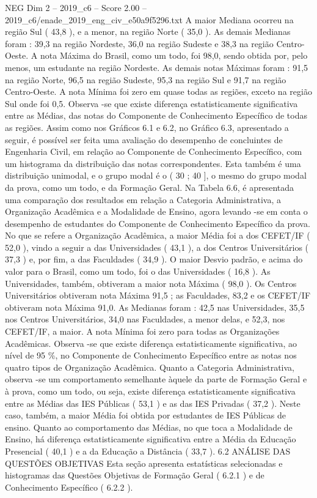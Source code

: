 \begin{textsample}{NEG Dim 2 – 2019\_c6 – Score 2.00 – 2019\_c6/enade\_2019\_eng\_civ\_e50a9f5296.txt}
A maior Mediana ocorreu na região Sul ( 43,8 ), e a menor, na região Norte ( 35,0 ).
As demais Medianas foram : 39,3 na região Nordeste, 36,0 na região Sudeste e 38,3 na região Centro-Oeste.
A nota Máxima do Brasil, como um todo, foi 98,0, sendo obtida por, pelo menos, um estudante na região Nordeste.
As demais notas Máximas foram : 91,5 na região Norte, 96,5 na região Sudeste, 95,3 na região Sul e 91,7 na região Centro-Oeste.
A nota Mínima foi zero em quase todas as regiões, exceto na região Sul onde foi 0,5.
Observa -se que existe diferença estatisticamente significativa entre as Médias, das notas do Componente de Conhecimento Específico de todas as regiões.
Assim como nos Gráficos 6.1 e 6.2, no Gráfico 6.3, apresentado a seguir, é possível ser feita uma avaliação do desempenho de concluintes de Engenharia Civil, em relação ao Componente de Conhecimento Específico, com um histograma da distribuição das notas correspondentes.
Esta também é uma distribuição unimodal, e o grupo modal é o ( 30 ; 40 ], o mesmo do grupo modal da prova, como um todo, e da Formação Geral.
Na Tabela 6.6, é apresentada uma comparação dos resultados em relação a Categoria Administrativa, a Organização Acadêmica e a Modalidade de Ensino, agora levando -se em conta o desempenho de estudantes do Componente de Conhecimento Específico da prova.
No que se refere a Organização Acadêmica, a maior Média foi a dos CEFET/IF ( 52,0 ), vindo a seguir a das Universidades ( 43,1 ), a dos Centros Universitários ( 37,3 ) e, por fim, a das Faculdades ( 34,9 ).
O maior Desvio padrão, e acima do valor para o Brasil, como um todo, foi o das Universidades ( 16,8 ).
As Universidades, também, obtiveram a maior nota Máxima ( 98,0 ).
Os Centros Universitários obtiveram nota Máxima 91,5 ; as Faculdades, 83,2 e os CEFET/IF obtiveram nota Máxima 91,0.
As Medianas foram : 42,5 nas Universidades, 35,5 nos Centros Universitários, 34,0 nas Faculdades, a menor delas, e 52,3, nos CEFET/IF, a maior.
A nota Mínima foi zero para todas as Organizações Acadêmicas.
Observa -se que existe diferença estatisticamente significativa, ao nível de 95 \%, no Componente de Conhecimento Específico entre as notas nos quatro tipos de Organização Acadêmica.
Quanto a Categoria Administrativa, observa -se um comportamento semelhante àquele da parte de Formação Geral e à prova, como um todo, ou seja, existe diferença estatisticamente significativa entre as Médias das IES Públicas ( 53,1 ) e as das IES Privadas ( 37,2 ).
Neste caso, também, a maior Média foi obtida por estudantes de IES Públicas de ensino.
Quanto ao comportamento das Médias, no que toca a Modalidade de Ensino, há diferença estatisticamente significativa entre a Média da Educação Presencial ( 40,1 ) e a da Educação a Distância ( 33,7 ). 6.2 ANÁLISE DAS QUESTÕES OBJETIVAS Esta seção apresenta estatísticas selecionadas e histogramas das Questões Objetivas de Formação Geral ( 6.2.1 ) e de Conhecimento Específico ( 6.2.2 ).

\end{textsample}
